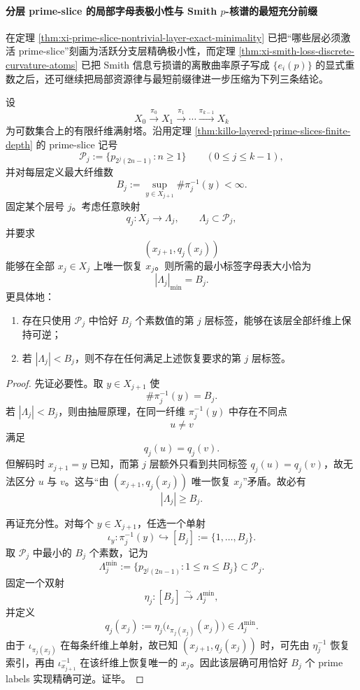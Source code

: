\paragraph{分层 prime-slice 的局部字母表极小性与 Smith \texorpdfstring{$p$}{p}-核谱的最短充分前缀}
在定理 \ref{thm:xi-prime-slice-nontrivial-layer-exact-minimality} 已把“哪些层必须激活 prime-slice”刻画为活跃分支层精确极小性，而定理 \ref{thm:xi-smith-loss-discrete-curvature-atoms} 已把 Smith 信息亏损谱的离散曲率原子写成 \(\{e_i(p)\}\) 的显式重数之后，还可继续把局部资源律与最短前缀律进一步压缩为下列三条结论。

\begin{theorem}\label{thm:xi-layered-primeslice-local-alphabet-fibermax}
设
\[
X_0\xrightarrow{\pi_0}X_1\xrightarrow{\pi_1}\cdots\xrightarrow{\pi_{k-1}}X_k
\]
为可数集合上的有限纤维满射塔。沿用定理 \ref{thm:killo-layered-prime-slices-finite-depth} 的 prime-slice 记号
\[
\mathcal P_j:=\{p_{2^j(2n-1)}:n\ge 1\}
\qquad (0\le j\le k-1),
\]
并对每层定义最大纤维数
\[
B_j:=\sup_{y\in X_{j+1}}\#\pi_j^{-1}(y)<\infty.
\]
固定某个层号 \(j\)。考虑任意映射
\[
q_j:X_j\to \Lambda_j,
\qquad
\Lambda_j\subset \mathcal P_j,
\]
并要求
\[
(x_{j+1},q_j(x_j))
\]
能够在全部 \(x_j\in X_j\) 上唯一恢复 \(x_j\)。则所需的最小标签字母表大小恰为
\[
|\Lambda_j|_{\min}=B_j.
\]
更具体地：
\begin{enumerate}
  \item 存在只使用 \(\mathcal P_j\) 中恰好 \(B_j\) 个素数值的第 \(j\) 层标签，能够在该层全部纤维上保持可逆；
  \item 若 \(|\Lambda_j|<B_j\)，则不存在任何满足上述恢复要求的第 \(j\) 层标签。
\end{enumerate}
\end{theorem}
\begin{proof}
先证必要性。取 \(y\in X_{j+1}\) 使
\[
\#\pi_j^{-1}(y)=B_j.
\]
若 \(|\Lambda_j|<B_j\)，则由抽屉原理，在同一纤维 \(\pi_j^{-1}(y)\) 中存在不同点
\[
u\neq v
\]
满足
\[
q_j(u)=q_j(v).
\]
但解码时 \(x_{j+1}=y\) 已知，而第 \(j\) 层额外只看到共同标签 \(q_j(u)=q_j(v)\)，故无法区分 \(u\) 与 \(v\)。这与“由 \((x_{j+1},q_j(x_j))\) 唯一恢复 \(x_j\)”矛盾。故必有
\[
|\Lambda_j|\ge B_j.
\]

再证充分性。对每个 \(y\in X_{j+1}\)，任选一个单射
\[
\iota_y:\pi_j^{-1}(y)\hookrightarrow [B_j]:=\{1,\dots,B_j\}.
\]
取 \(\mathcal P_j\) 中最小的 \(B_j\) 个素数，记为
\[
\Lambda_j^{\min}:=\{p_{2^j(2n-1)}:1\le n\le B_j\}\subset \mathcal P_j.
\]
固定一个双射
\[
\eta_j:[B_j]\xrightarrow{\sim}\Lambda_j^{\min},
\]
并定义
\[
q_j(x_j):=\eta_j\!\bigl(\iota_{\pi_j(x_j)}(x_j)\bigr)\in \Lambda_j^{\min}.
\]
由于 \(\iota_{\pi_j(x_j)}\) 在每条纤维上单射，故已知 \((x_{j+1},q_j(x_j))\) 时，可先由 \(\eta_j^{-1}\) 恢复索引，再由 \(\iota_{x_{j+1}}^{-1}\) 在该纤维上恢复唯一的 \(x_j\)。因此该层确可用恰好 \(B_j\) 个 prime labels 实现精确可逆。证毕。
\end{proof}


